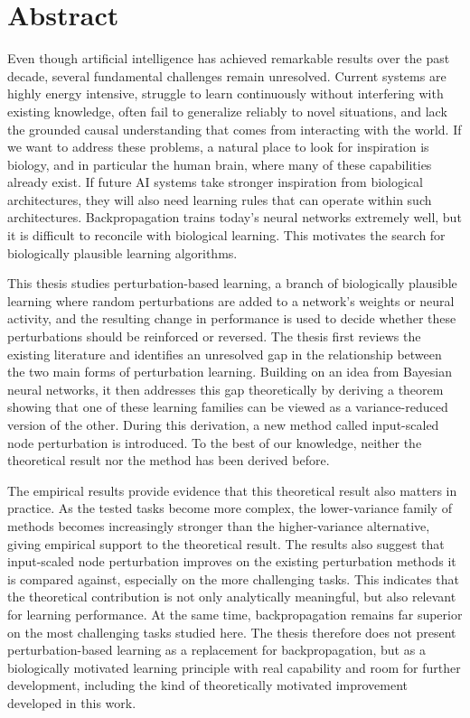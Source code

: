 \section*{Abstract}
Even though artificial intelligence has achieved remarkable results over the past decade, several fundamental challenges remain unresolved. Current systems are highly energy intensive, struggle to learn continuously without interfering with existing knowledge, often fail to generalize reliably to novel situations, and lack the grounded causal understanding that comes from interacting with the world. If we want to address these problems, a natural place to look for inspiration is biology, and in particular the human brain, where many of these capabilities already exist. If future AI systems take stronger inspiration from biological architectures, they will also need learning rules that can operate within such architectures. Backpropagation trains today’s neural networks extremely well, but it is difficult to reconcile with biological learning. This motivates the search for biologically plausible learning algorithms.

This thesis studies perturbation-based learning, a branch of biologically plausible learning where random perturbations are added to a network’s weights or neural activity, and the resulting change in performance is used to decide whether these perturbations should be reinforced or reversed. The thesis first reviews the existing literature and identifies an unresolved gap in the relationship between the two main forms of perturbation learning. Building on an idea from Bayesian neural networks, it then addresses this gap theoretically by deriving a theorem showing that one of these learning families can be viewed as a variance-reduced version of the other. During this derivation, a new method called input-scaled node perturbation is introduced. To the best of our knowledge, neither the theoretical result nor the method has been derived before.

The empirical results provide evidence that this theoretical result also matters in practice. As the tested tasks become more complex, the lower-variance family of methods becomes increasingly stronger than the higher-variance alternative, giving empirical support to the theoretical result. The results also suggest that input-scaled node perturbation improves on the existing perturbation methods it is compared against, especially on the more challenging tasks. This indicates that the theoretical contribution is not only analytically meaningful, but also relevant for learning performance. At the same time, backpropagation remains far superior on the most challenging tasks studied here. The thesis therefore does not present perturbation-based learning as a replacement for backpropagation, but as a biologically motivated learning principle with real capability and room for further development, including the kind of theoretically motivated improvement developed in this work.

\clearpage
